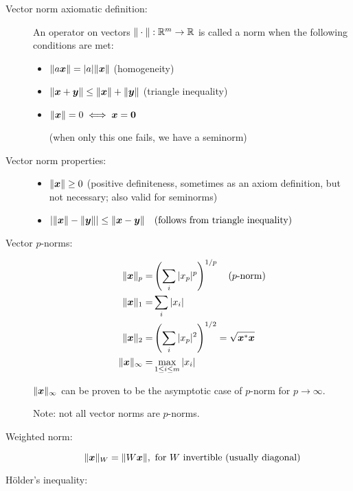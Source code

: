 \documentclass[
  12pt,
  paper=a4,
]{scrartcl} %
\begin{document}
\newpage
{}

\begin{description}
\item[Vector norm axiomatic definition:]\phantom{ }

An operator on vectors $\|\cdot\| : \mathbb R^m \to \mathbb R$ is called a norm when the following conditions are met:

    \begin{itemize}
        \item $\|a\bm x\| = |a| \|\bm x\|$ (homogeneity)
        \item $\|\bm x + \bm y\| \le \|\bm x\| + \|\bm y\|$ (triangle inequality)
        \item $\|\bm x\| = 0 \iff \bm x = \bm 0$
        
        (when only this one fails, we have a seminorm)
    \end{itemize}
\item[Vector norm properties:]\phantom{ }
    \begin{itemize}
        \item $\|\bm x\| \ge 0$ (positive definiteness, sometimes as an axiom definition, but not necessary; also valid for seminorms)
        \item $
        |\|\bm x\| - \|\bm y\| | \le \|\bm x - \bm y\|
        \quad \text{(follows from triangle inequality)}
        $
    \end{itemize}

\item[Vector $p$-norms:]\phantom{ }
\begin{align*}
    \|\bm x\|_p =& \left(\sum_i |x_p|^p\right)^{1/p}
    \quad \text{($p$-norm)}
    \\
    \|\bm x\|_1 =& \sum_i |x_i|
    \\
    \|\bm x\|_2 =& \left(\sum_i |x_p|^2\right)^{1/2}
    = \sqrt{\bm x ^* \bm x}
    \\
    \|\bm x\|_\infty =& \max_{1\le i\le m}|x_i|
\end{align*}

$\|\bm x\|_\infty$ can be proven to be the asymptotic case of $p$-norm for $p\to\infty$.

Note: not all vector norms are $p$-norms.

\item[Weighted norm:]\phantom{ }
\[
\|\bm x\|_W = \|W\bm x\|, \text{ for $W$ invertible (usually diagonal)}
\]

\item[H\"older's inequality:]


\end{description}
\end{document}

